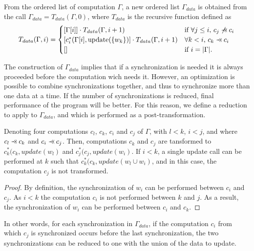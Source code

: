 \begin{mydef}
From the ordered list of computation $\Gamma$, a new ordered list $\Gamma_{data}$ is obtained from the call $\Gamma_{data} = T_{data}(\Gamma,0)$, where $T_{data}$ is the recursive function defined as
\begin{equation*}
T_{data}(\Gamma,i) = 
\begin{cases} 	[\Gamma[i]] \cdot T_{data}(\Gamma,i+1) & \mbox{if }\forall j\leq i\mbox{, } c_j \not\pprec c_i\\
				[c^*_i(\Gamma[i],\text{update}(\{w_k\})] \cdot T_{data}(\Gamma,i+1) & \forall k < i\mbox{, }c_k \pprec c_i\\
				[] & \mbox{if }i=|\Gamma|.
\end{cases}
\end{equation*}
\end{mydef}

The construction of $\Gamma_{data}$ implies that if a synchronization is needed it is always proceeded before the computation wich needs it. However, an optimization is possible to combine synchronizations together, and thus to synchronize more than one data at a time. If the number of synchronizations is reduced, final performance of the program will be better. For this reason, we define a reduction to apply to $\Gamma_{data}$, and which is performed as a post-transformation.

\begin{myprop}
Denoting four computations $c_l$, $c_k$, $c_i$ and $c_j$ of $\Gamma$, with $l<k$, $i<j$, and where $c_l \pprec c_k$ and $c_i \pprec c_j$. Then, computations $c_k$ and $c_j$ are tansformed to $c^*_k(c_k,update(w_l)$ and $c^*_j(c_j,update(w_i)$. If $i<k$, a single update call can be performed at $k$ such that $c^*_k(c_k,update(w_l\cup w_i)$, and in this case, the computation $c_j$ is not transformed.
\end{myprop}

\begin{proof}
By definition, the synchronization of $w_i$ can be performed between $c_i$ and $c_j$. As $i<k$ the computation $c_i$ is not performed between $k$ and $j$. As a result, the synchronization of $w_i$ can be performed between $c_i$ and $c_k$.
\end{proof}

In other words, for each synchronization in $\Gamma_{data}$, if the computation $c_i$ from which $c_j$ is synchronized occurs before the last synchronization, the two synchronizations can be reduced to one with the union of the data to update.

